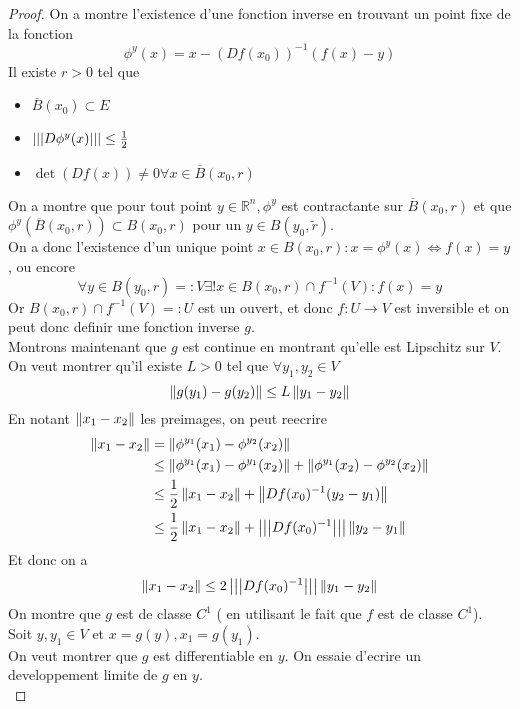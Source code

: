 \documentclass[../main.tex]{subfiles}
\begin{document}
\begin{proof}
	On a montre l'existence d'une fonction inverse en trouvant un point fixe de la fonction
	\[ 
		\phi^{y}( x) = x - ( Df( x_0) ) ^{-1}( f( x) -y) 
	\]
	Il existe $r>0$ tel que
	\begin{itemize}
		\item $\overline{B}( x_0)\subset E$ 
		\item $\left\vert\left\vert\left\vert D \phi ^{y}( x) \right\vert\right\vert\right\vert\leq \frac{1}{2}$ 	
		\item $\det ( Df( x) )\neq 0 \forall x \in \overline{B}( x_0,r) $
	\end{itemize}
	On a montre que pour tout point $y \in \mathbb{R}^n, \phi^{y}$ est contractante sur $\overline{B}( x_0,r) $ et que $\phi^{y}( \overline{B}( x_{0},r) ) \subset B( x_0,r) $ pour un $y \in B( y_0,\tilde r) $.\\
	On a donc l'existence d'un unique point $x \in B( x_0,r) : x = \phi^{y}( x) \iff f( x) =y$, ou encore
		\[ 
			\forall y \in B( y_0,r) =: V \exists ! x \in B( x_0,r) \cap f^{-1}( V) : f( x) =y
		\]
		Or $B(x_0,r ) \cap f^{-1}( V)=:U  $ est un ouvert, et donc $f:U\to V$ est inversible et on peut donc definir une fonction inverse $g$.\\
		Montrons maintenant que $g$ est continue en montrant qu'elle est Lipschitz sur $V$. 
		On veut montrer qu'il existe $L>0$ tel que $\forall y_1,y_2\in V$ 
		\[ 
			\left\lVert g( y_1) - g( y_2) \right\rVert \leq L \left\lVert y_1-y_2\right\rVert 
		\]
		En notant $\left\lVert x_1-x_2\right\rVert $ les preimages, on peut reecrire
		\begin{align*}
			\left\lVert x_1-x_2\right\rVert &= \left\lVert \phi^{y_1}( x_1) - \phi^{y_2}( x_2) \right\rVert \\
				      &\leq \left\lVert \phi^{y_1}( x_1) - \phi^{y_1}( x_2) \right\rVert + \left\lVert \phi^{y_1}( x_2) - \phi^{y_2}( x_2) \right\rVert \\
				      &\leq \frac{1}{2} \left\lVert x_1-x_2\right\rVert + \left\lVert D f( x_0) ^{-1}(  y_2-y_1) \right\rVert \\
				      &\leq \frac{1}{2}\left\lVert x_1-x_2\right\rVert  + \left\vert\left\vert\left\vert Df( x_0)^{-1}\right\vert\right\vert\right\vert \left\lVert y_2-y_1\right\rVert 
		\end{align*}
		Et donc on a
		\[ 
			\left\lVert x_1-x_2\right\rVert \leq 2 \left\vert\left\vert\left\vert Df( x_0) ^{-1}\right\vert\right\vert\right\vert \left\lVert y_1-y_2\right\rVert 
		\]
		On montre que $g$ est de classe $C^{1}$ ( en utilisant le fait que $f$ est de classe $C^{1}$).\\
		Soit $y,y_1 \in V $ et $x = g( y) , x_1= g( y_1) $.\\
		On veut montrer que $g$ est differentiable en $y$. On essaie d'ecrire un developpement limite de $g$ en $y$.\\

\end{proof}
\end{document}
